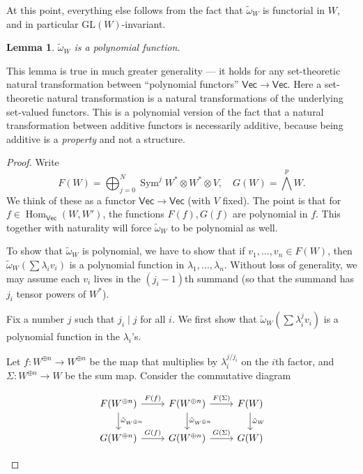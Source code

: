 \documentclass{shortart}
\newtheorem{lemma}[thm]{Lemma}
\theoremstyle{definition}
\DeclareMathOperator\Hom{Hom}
\DeclareMathOperator\Sym{Sym}
\newcommand\Vect{\mathsf{Vec}}
\newcommand\GL{\mathrm{GL}}
\newcommand\exterior{{\textstyle \bigwedge}}
\begin{document}
At this point, everything else follows from the fact that $\tilde{\omega}_W$ is functorial in $W$, and in particular $\GL(W)$-invariant.
\begin{lemma}
  $\tilde{\omega}_W$ is a polynomial function.
\end{lemma}

This lemma is true in much greater generality --- it holds for any set-theoretic natural transformation between ``polynomial functors'' $\Vect \to \Vect$. Here a set-theoretic natural transformation is a natural transformations of the underlying set-valued functors. This is a polynomial version of the fact that a natural transformation between additive functors is necessarily additive, because being additive is a \emph{property} and not a structure.

\begin{proof}
  Write
  \[
    F(W) = \bigoplus_{j = 0}^N \Sym^j W^* \otimes W^* \otimes V,\quad G(W) = \exterior^p W.
  \]
  We think of these as a functor $\Vect \to \Vect$ (with $V$ fixed). The point is that for $f \in \Hom_\Vect(W, W')$, the functions $F(f), G(f)$ are polynomial in $f$. This together with naturality will force $\tilde{\omega}_W$ to be polynomial as well.

  To show that $\tilde{\omega}_W$ is polynomial, we have to show that if $v_1, \ldots, v_n \in F(W)$, then $\tilde{\omega}_W(\sum \lambda_i v_i)$ is a polynomial function in $\lambda_1, \ldots, \lambda_n$. Without loss of generality, we may assume each $v_i$ lives in the $(j_i - 1)$th summand (so that the summand has $j_i$ tensor powers of $W^*$).

  Fix a number  $j$ such that $j_i \mid j$ for all $i$. We first show that $\tilde{\omega}_W(\sum \lambda_i^j v_i)$ is a polynomial function in the $\lambda_i$'s.

  Let $f: W^{\oplus n} \to W^{\oplus n}$ be the map that multiplies by $\lambda_i^{j / j_i}$ on the $i$th factor, and $\Sigma: W^{\oplus n} \to W$ be the sum map. Consider the commutative diagram
  \begin{useimager}
    \[
      \begin{tikzcd}
        F(W^{\oplus n}) \ar[r, "F(f)"] \ar[d, "\tilde{\omega}_{W^{\oplus n}}"] & F(W^{\oplus n}) \ar[r, "F(\Sigma)"]\ar[d, "\tilde{\omega}_{W^{\oplus n}}"] & F(W)\ar[d, "\tilde{\omega}_{W}"] \\
        G(W^{\oplus n}) \ar[r, "G(f)"] & G(W^{\oplus n}) \ar[r, "G(\Sigma)"] & G(W)
      \end{tikzcd}
    \]
  \end{useimager}%


\end{proof}
\end{document}
